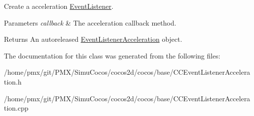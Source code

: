 Create a acceleration \hyperlink{classEventListener}{Event\+Listener}.


\begin{DoxyParams}{Parameters}
{\em callback} & The acceleration callback method. \\
\hline
\end{DoxyParams}
\begin{DoxyReturn}{Returns}
An autoreleased \hyperlink{classEventListenerAcceleration}{Event\+Listener\+Acceleration} object. 
\end{DoxyReturn}


The documentation for this class was generated from the following files\+:\begin{DoxyCompactItemize}
\item 
/home/pmx/git/\+P\+M\+X/\+Simu\+Cocos/cocos2d/cocos/base/C\+C\+Event\+Listener\+Acceleration.\+h\item 
/home/pmx/git/\+P\+M\+X/\+Simu\+Cocos/cocos2d/cocos/base/C\+C\+Event\+Listener\+Acceleration.\+cpp\end{DoxyCompactItemize}
